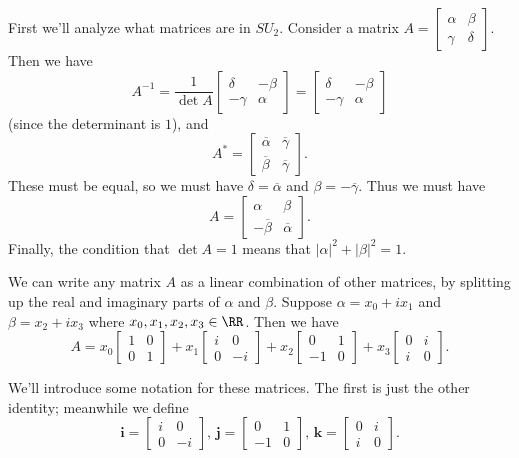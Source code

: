 First we'll analyze what matrices are in $SU_2$. Consider a matrix $A = \begin{bmatrix} \alpha & \beta \\ \gamma & \delta \end{bmatrix}$. Then we have \[A^{-1} = \frac{1}{\det A} \begin{bmatrix} \delta & -\beta \\ -\gamma & \alpha \end{bmatrix} = \begin{bmatrix} \delta & -\beta \\ -\gamma & \alpha \end{bmatrix}\] (since the determinant is $1$), and \[A^* = \begin{bmatrix} \overline{\alpha} & \overline{\gamma} \\ \overline{\beta} & \overline{\gamma} \end{bmatrix}.\] These must be equal, so we must have $\delta = \overline{\alpha} $ and $\beta = - \overline{\gamma}$. 
Thus we must have \[A = \begin{bmatrix}\alpha & \beta \\ -\overline{\beta} & \overline{\alpha} \end{bmatrix}.\] Finally, the condition that $\det A = 1$ means that $|\alpha|^2 + |\beta|^2 = 1$. 

We can write any matrix $A$ as a linear combination of other matrices, by splitting up the real and imaginary parts of $\alpha$ and $\beta$. Suppose $\alpha = x_0 + i x_1$ and $\beta = x_2 + i x_3$ where $x_0, x_1, x_2, x_3 \in \RR$. Then we have
\[ A = x_0 \begin{bmatrix} 1 & 0 \\ 0 & 1\end{bmatrix} + x_1 \begin{bmatrix} i & 0 \\ 0 & -i \end{bmatrix} + x_2 \begin{bmatrix} 0 & 1 \\ -1 & 0 \end{bmatrix} + x_3 \begin{bmatrix} 0 & i \\ i & 0 \end{bmatrix} .\] 

We'll introduce some notation for these matrices. The first is just the other identity; meanwhile we define
\[ \mathbf{i} = \begin{bmatrix} i & 0 \\ 0 & -i \end{bmatrix}, \, \mathbf{j} = \begin{bmatrix}0 & 1 \\ -1 & 0 \end{bmatrix}, \, \mathbf{k} = \begin{bmatrix} 0 & i \\ i & 0 \end{bmatrix} . \]


